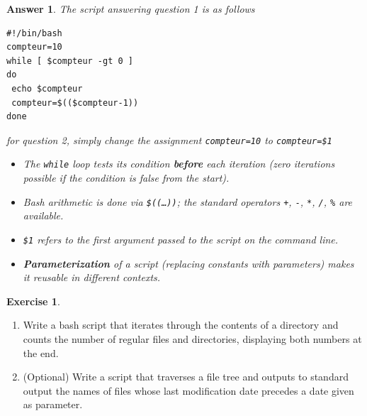 \documentclass[a4paper,11pt]{article}
\theoremstyle{plain}
\newtheorem{correction}{Answer}
\theoremstyle{definition}
\newtheorem{exercice}{Exercise}
\begin{document}
\begin{correction}
The script answering question 1 is as follows
\begin{lstlisting}
#!/bin/bash
compteur=10
while [ $compteur -gt 0 ]
do
 echo $compteur
 compteur=$(($compteur-1))
done
\end{lstlisting}
for question 2, simply change the assignment \texttt{compteur=10} to \texttt{compteur=\$1}

\begin{pointcle}
\begin{itemize}
    \item The \texttt{while} loop tests its condition \textbf{before} each iteration (zero iterations possible if the condition is false from the start).
    \item Bash arithmetic is done via \texttt{\$((\ldots))}; the standard operators \texttt{+}, \texttt{-}, \texttt{*}, \texttt{/}, \texttt{\%} are available.
    \item \texttt{\$1} refers to the first argument passed to the script on the command line.
    \item \textbf{Parameterization} of a script (replacing constants with parameters) makes it reusable in different contexts.
\end{itemize}
\end{pointcle}

\end{correction}


\begin{exercice}
\begin{enumerate}
\item Write a bash script that iterates through the contents of a directory and counts the number of regular files and directories, displaying both numbers at the end.
\item  (Optional) Write a script that traverses a file tree and outputs to standard output the names of files whose last modification date precedes a date given as parameter.
\end{enumerate}
\end{exercice}
\end{document}

